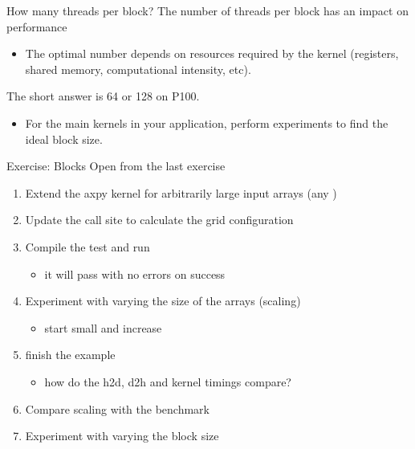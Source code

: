 \documentclass[aspectratio=43]{beamer}
\newcommand{\axpy}{{\ttfamily axpy}\xspace}
\begin{document}
\begin{frame}[fragile]{How many threads per block?}
    The number of threads per block has an impact on performance
    \begin{itemize}
        \item The optimal number depends on resources required by the kernel (registers, shared memory, computational intensity, etc).
    \end{itemize}
    The short answer is 64 or 128 on P100.
    \begin{itemize}
        \item For the main kernels in your application, perform experiments to find the ideal block size.
    \end{itemize}
\end{frame}

\begin{frame}[fragile]{Exercise: Blocks}
    Open  from the last exercise
    \begin{enumerate}
        \item Extend the \axpy kernel for arbitrarily large input arrays (any )

        \item Update the call site to calculate the grid configuration

        \item Compile the test and run
        \begin{itemize}
            \item it will pass with no errors on success
        \end{itemize}

        \item Experiment with varying the size of the arrays (scaling)
        \begin{itemize}
            \item start small and increase
        \end{itemize}

        \item finish the  example
        \begin{itemize}
            \item how do the h2d, d2h and kernel timings compare?
        \end{itemize}

        \item \extra Compare scaling with the  benchmark

        \item \extra Experiment with varying the block size

    \end{enumerate}

\end{frame}
\end{document}
